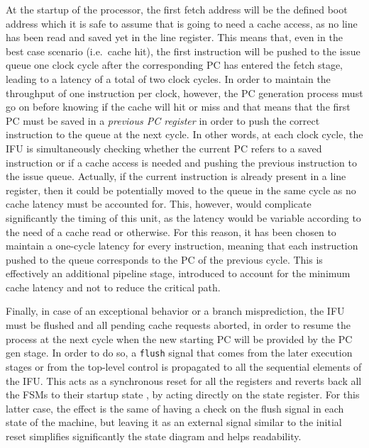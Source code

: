 At the startup of the processor, the first fetch address will be the defined boot address which it is safe to assume that is going to need a cache access, as no line has been read and saved yet in the line register. This means that, even in the best case scenario (i.e.\ cache hit), the first instruction will be pushed to the issue queue one clock cycle after the corresponding \ac{PC} has entered the fetch stage, leading to a latency of a total of two clock cycles. In order to maintain the throughput of one instruction per clock, however, the \ac{PC} generation process must go on before knowing if the cache will hit or miss and that means that the first \ac{PC} must be saved in a \emph{previous \ac{PC} register} in order to push the correct instruction to the queue at the next cycle. In other words, at each clock cycle, the \ac{IFU} is simultaneously checking whether the current \ac{PC} refers to a saved instruction or if a cache access is needed and pushing the previous instruction to the issue queue. Actually, if the current instruction is already present in a line register, then it could be potentially moved to the queue in the same cycle as no cache latency must be accounted for. This, however, would complicate significantly the timing of this unit, as the latency would be variable according to the need of a cache read or otherwise. For this reason, it has been chosen to maintain a one-cycle latency for every instruction, meaning that each instruction pushed to the queue corresponds to the \ac{PC} of the previous cycle. This is effectively an additional pipeline stage, introduced to account for the minimum cache latency and not to reduce the critical path.

Finally, in case of an exceptional behavior or a branch misprediction, the \ac{IFU} must be flushed and all pending cache requests aborted, in order to resume the process at the next cycle when the new starting \ac{PC} will be provided by the \ac{PC} gen stage. In order to do so, a \texttt{flush} signal that comes from the later execution stages or from the top-level control is propagated to all the sequential elements of the \ac{IFU}. This acts as a synchronous reset for all the registers and reverts back all the \acsp{FSM} to their startup state \cite{resets}, by acting directly on the state register. For this latter case, the effect is the same of having a check on the flush signal in each state of the machine, but leaving it as an external signal similar to the initial reset simplifies significantly the state diagram and helps readability.


